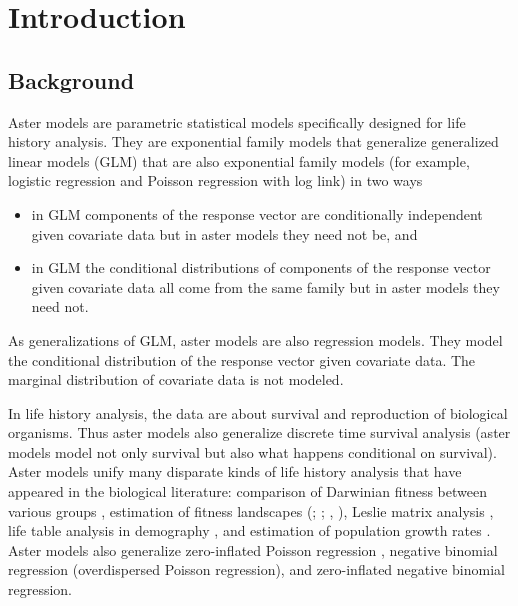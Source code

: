
\chapter{Introduction}
\label{ch:introduction}

\section{Background}
\label{sec:background}

Aster models \citep*{aster1,aster2,reaster} 
are parametric statistical models
specifically designed for life history analysis.  They are exponential family
models that generalize generalized linear models (GLM) that are also
exponential family models (for example, logistic regression and
Poisson regression with log link) in two ways
\begin{itemize}
\item in GLM components of the response vector are
    conditionally independent given covariate data
    but in aster models they need not be, and
\item in GLM the conditional distributions of components of the
    response vector given covariate data all come from the same family
    but in aster models they need not.
\end{itemize}
As generalizations of GLM, aster models are also regression models.
They model the conditional distribution of the response vector given
covariate data.  The marginal distribution of covariate data is not
modeled.

In life history analysis,
the data are about survival and reproduction
of biological organisms.  Thus aster models also generalize discrete time
survival analysis (aster models model not only survival but also
what happens conditional on survival).
Aster models unify many disparate kinds of life history analysis that have
appeared in the biological literature: comparison of Darwinian fitness between
various groups \citep{aster1,aster2}, estimation of fitness landscapes
(\citealp{lande-arnold}; \citealp{mitchell-olds-shaw}; \citealp{aster2,aster3},
\citealp*{aster-hornworm}),
Leslie matrix analysis
\citep{caswell}, life table analysis in demography \citep{goodman},
and estimation of population growth rates
\citep{fisher,lenski-service,aster2,aster-hornworm}.
Aster models also generalize zero-inflated Poisson regression \citep{lambert},
negative binomial regression (overdispersed Poisson regression),
and zero-inflated negative binomial regression.

